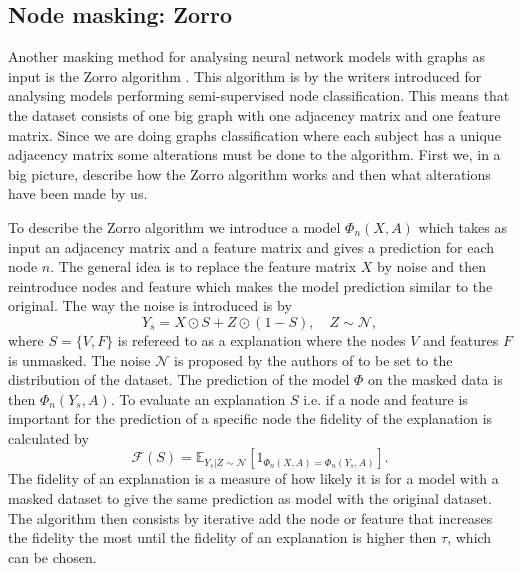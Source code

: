 \subsection{Node masking: Zorro}
Another masking method for analysing neural network models with graphs as input is the Zorro algorithm \cite{}. This algorithm is by the writers introduced for analysing models performing semi-supervised node classification. This means that the dataset consists of one big graph with one adjacency matrix and one feature matrix. Since we are doing graphs classification where each subject has a unique adjacency matrix some alterations must be done to the algorithm. First we, in a big picture, describe how the Zorro algorithm works and then what alterations have been made by us.

To describe the Zorro algorithm we introduce a model $\Phi_n(X,A)$ which takes as input an adjacency matrix and a feature matrix and gives a prediction for each node $n$. The general idea is to replace the feature matrix $X$ by noise and then reintroduce nodes and feature which makes the model prediction similar to the original. The way the noise is introduced is by 
\begin{equation*}
    Y_s = X \odot S + Z \odot (1- S), \quad Z \sim \mathcal{N}, 
\end{equation*}
where $S = \{V, F\}$ is refereed to as a explanation where the nodes $V$ and features $F$ is unmasked. The noise $\mathcal{N}$ is proposed by the authors of \cite{} to be set to the distribution of the dataset. The prediction of the model $\Phi$ on the masked data is then $\Phi_n(Y_s, A)$. To evaluate an explanation $S$ i.e. if a node and feature is important for the prediction of a specific node the fidelity of the explanation is calculated by
\begin{equation*}
    \mathcal{F}(S) = \mathbb{E}_{Y_s|Z\sim\mathcal{N}}[1_{\Phi_n(X,A) = \Phi_n(Y_s,A)}].
\end{equation*}
The fidelity of an explanation is a measure of how likely it is for a model with a masked dataset to give the same prediction as model with the original dataset. The algorithm then consists by iterative add the node or feature that increases the fidelity the most until the fidelity of an explanation is higher then $\tau$, which can be chosen.


